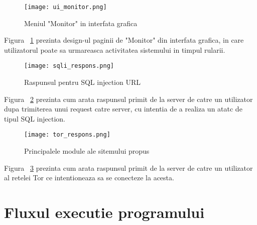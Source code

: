 \begin{figure}[h]
	\centering
	\texttt{[image: ui\_monitor.png]}
	\caption{Meniul "Monitor" in interfata grafica}
	\label{fig:ui_monitor}
\end{figure}
Figura ~\ref{fig:ui_monitor} prezinta design-ul paginii de "Monitor" din interfata grafica, in care utilizatorul poate sa urmareasca activitatea sistemului in timpul rularii. \\

\begin{figure}[h]
	\centering
	\texttt{[image: sqli\_respons.png]}
	\caption{Raspunsul pentru SQL injection URL}
	\label{fig:sqli_respons}
\end{figure}

Figura ~\ref{fig:sqli_respons} prezinta cum arata raspunsul primit de la server de catre un utilizator dupa trimiterea unui request catre server, cu intentia de a realiza un atatc de tipul SQL injection. \\

\begin{figure}[h]
	\centering
	\texttt{[image: tor\_respons.png]}
	\caption{Principalele module ale sitemului propus}
	\label{fig:tor_respons}
\end{figure}
Figura ~\ref{fig:tor_respons} prezinta cum arata raspunsul primit de la server de catre un utilizator al retelei Tor ce intentioneaza sa se conecteze la acesta. \\


\section{Fluxul executie programului}
%
%
%
%
%
%
%  
%    
%    
